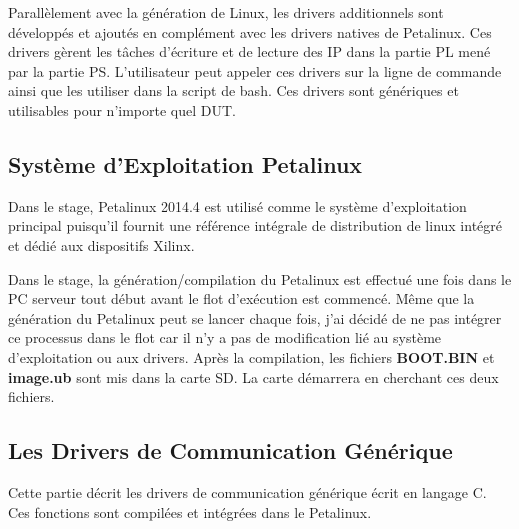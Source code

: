 Parallèlement avec la génération de Linux, les drivers additionnels sont développés et ajoutés en complément
avec les drivers natives de Petalinux. Ces drivers gèrent les tâches d'écriture et de lecture des IP dans la partie PL mené
par la partie PS. L'utilisateur peut appeler ces drivers sur la ligne de commande ainsi que les utiliser dans la script
de bash. Ces drivers sont génériques et utilisables pour n'importe quel DUT.


\subsection{Système d'Exploitation Petalinux}

Dans le stage, Petalinux 2014.4 est utilisé comme le système d'exploitation principal puisqu'il fournit une référence
intégrale de distribution de linux intégré et dédié aux dispositifs Xilinx.

Dans le stage, la génération/compilation du Petalinux est effectué une fois dans le PC serveur tout début avant le flot d'exécution est commencé.
Même que la génération du Petalinux peut se lancer chaque fois, j'ai décidé de ne pas intégrer ce processus dans le flot
car il n'y a pas de modification lié au système d'exploitation ou aux drivers.
Après la compilation, les fichiers \textbf{BOOT.BIN} et \textbf{image.ub} sont mis dans la carte SD. La carte démarrera
en cherchant ces deux fichiers.

\subsection{Les Drivers de Communication Générique}
\label{subsec:embedded}

Cette partie décrit les drivers de communication générique écrit en langage C. Ces fonctions
sont compilées et intégrées dans le Petalinux.

